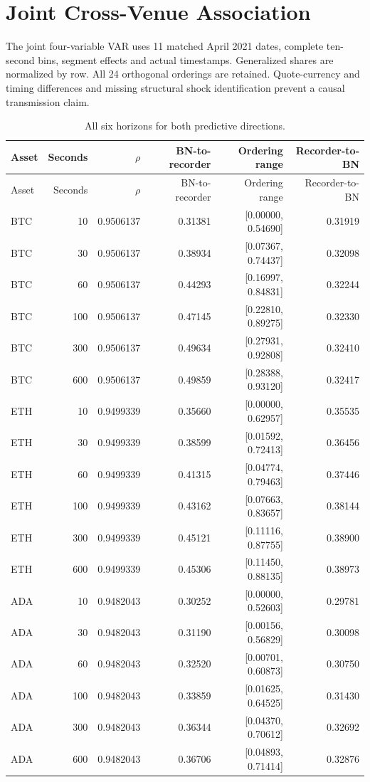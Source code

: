 \documentclass[10pt]{article}
\begin{document}
\section{Joint Cross-Venue Association}
The joint four-variable VAR uses 11 matched April 2021 dates, complete ten-second bins, segment effects and actual timestamps. Generalized shares are normalized by row. All 24 orthogonal orderings are retained. Quote-currency and timing differences and missing structural shock identification prevent a causal transmission claim.


\small\setlength{\tabcolsep}{3pt}
\begin{longtable}{lrrrrr}
\caption{All six horizons for both predictive directions.}\label{tab:joint_fevd_all_horizons}\\
\toprule
Asset & Seconds & $\rho$ & BN-to-recorder & Ordering range & Recorder-to-BN \\\midrule\endfirsthead
\toprule
Asset & Seconds & $\rho$ & BN-to-recorder & Ordering range & Recorder-to-BN \\\midrule\endhead
BTC & 10 & 0.9506137 & 0.31381 & [0.00000, 0.54690] & 0.31919 \\
BTC & 30 & 0.9506137 & 0.38934 & [0.07367, 0.74437] & 0.32098 \\
BTC & 60 & 0.9506137 & 0.44293 & [0.16997, 0.84831] & 0.32244 \\
BTC & 100 & 0.9506137 & 0.47145 & [0.22810, 0.89275] & 0.32330 \\
BTC & 300 & 0.9506137 & 0.49634 & [0.27931, 0.92808] & 0.32410 \\
BTC & 600 & 0.9506137 & 0.49859 & [0.28388, 0.93120] & 0.32417 \\
ETH & 10 & 0.9499339 & 0.35660 & [0.00000, 0.62957] & 0.35535 \\
ETH & 30 & 0.9499339 & 0.38599 & [0.01592, 0.72413] & 0.36456 \\
ETH & 60 & 0.9499339 & 0.41315 & [0.04774, 0.79463] & 0.37446 \\
ETH & 100 & 0.9499339 & 0.43162 & [0.07663, 0.83657] & 0.38144 \\
ETH & 300 & 0.9499339 & 0.45121 & [0.11116, 0.87755] & 0.38900 \\
ETH & 600 & 0.9499339 & 0.45306 & [0.11450, 0.88135] & 0.38973 \\
ADA & 10 & 0.9482043 & 0.30252 & [0.00000, 0.52603] & 0.29781 \\
ADA & 30 & 0.9482043 & 0.31190 & [0.00156, 0.56829] & 0.30098 \\
ADA & 60 & 0.9482043 & 0.32520 & [0.00701, 0.60873] & 0.30750 \\
ADA & 100 & 0.9482043 & 0.33859 & [0.01625, 0.64525] & 0.31430 \\
ADA & 300 & 0.9482043 & 0.36344 & [0.04370, 0.70612] & 0.32692 \\
ADA & 600 & 0.9482043 & 0.36706 & [0.04893, 0.71414] & 0.32876 \\
\bottomrule\end{longtable}\normalsize
\end{document}

